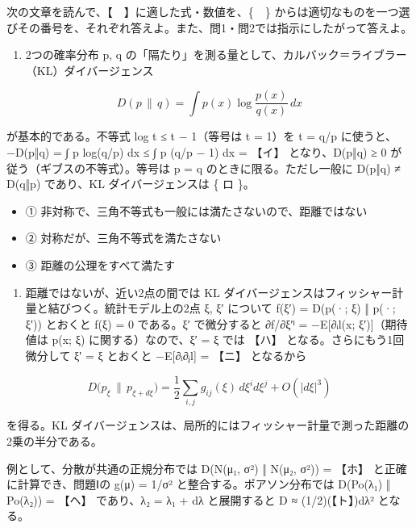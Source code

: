 \documentclass[
  10pt,
  a4paper,
]{article}
\providecommand{\tightlist}{%
  \setlength{\itemsep}{0pt}\setlength{\parskip}{0pt}}
\begin{document}
次の文章を読んで、【　】に適した式・数値を、\{　\}
からは適切なものを一つ選びその番号を、それぞれ答えよ。また、問1・問2では指示にしたがって答えよ。

\begin{enumerate}
\def\labelenumi{(\arabic{enumi})}
\tightlist
\item
  2つの確率分布 p, q
  の「隔たり」を測る量として、カルバック＝ライブラー（KL）ダイバージェンス
\end{enumerate}

\[D(p \,\|\, q) = \int p(x) \log \frac{p(x)}{q(x)}\, dx\]

が基本的である。不等式 log t ≤ t − 1（等号は t = 1）を t = q/p
に使うと、−D(p‖q) = ∫ p log(q/p) dx ≤ ∫ p (q/p − 1) dx = 【イ】
となり、D(p‖q) ≥ 0 が従う（ギブスの不等式）。等号は p = q
のときに限る。ただし一般に D(p‖q) ≠ D(q‖p) であり、KL ダイバージェンスは
\{ ロ \}。

\begin{itemize}
\tightlist
\item
  ① 非対称で、三角不等式も一般には満たさないので、距離ではない
\item
  ② 対称だが、三角不等式を満たさない
\item
  ③ 距離の公理をすべて満たす
\end{itemize}

\begin{enumerate}
\def\labelenumi{(\arabic{enumi})}
\setcounter{enumi}{1}
\tightlist
\item
  距離ではないが、近い2点の間では KL
  ダイバージェンスはフィッシャー計量と結びつく。統計モデル上の2点 ξ, ξ′
  について f(ξ′) = D(p(·; ξ) ‖ p(·; ξ′)) とおくと f(ξ) = 0 である。ξ′
  で微分すると ∂f/∂ξ′{\fallbackfont ⁱ} = −E{[}∂{\fallbackfont ᵢ}l(x;
  ξ′){]}（期待値は p(x; ξ) に関する）なので、ξ′ = ξ では 【ハ】
  となる。さらにもう1回微分して ξ′ = ξ とおくと
  −E{[}∂{\fallbackfont ᵢ}∂{\fallbackfont ⱼ}l{]} = 【ニ】 となるから
\end{enumerate}

\[D\big(p_\xi \,\|\, p_{\xi + d\xi}\big) = \frac{1}{2} \sum_{i,j} g_{ij}(\xi)\, d\xi^i d\xi^j + O(|d\xi|^3)\]

を得る。KL
ダイバージェンスは、局所的にはフィッシャー計量で測った距離の2乗の半分である。

例として、分散が共通の正規分布では D(N(μ{\fallbackfont ₁}, σ²) ‖
N(μ{\fallbackfont ₂}, σ²)) = 【ホ】 と正確に計算でき、問題Ⅰの g(μ) =
1/σ² と整合する。ポアソン分布では D(Po(λ{\fallbackfont ₁}) ‖
Po(λ{\fallbackfont ₂})) = 【ヘ】 であり、λ{\fallbackfont ₂} =
λ{\fallbackfont ₁} + dλ と展開すると D ≈ (1/2)(【ト】)dλ² となる。
\end{document}
